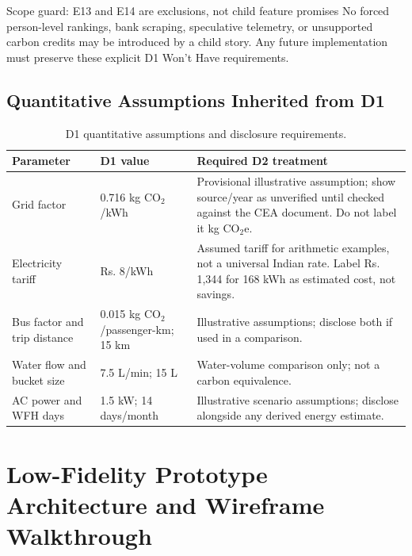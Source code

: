\documentclass[12pt,a4paper]{article}
\begin{document}
\begin{cautionbox}{Scope guard: E13 and E14 are exclusions, not child feature promises}
No forced person-level rankings, bank scraping, speculative telemetry, or unsupported carbon credits may be introduced by a child story. Any future implementation must preserve these explicit D1 Won't Have requirements.
\end{cautionbox}

\subsection{Quantitative Assumptions Inherited from D1}
\begin{table}[H]
\centering
\small
\caption{D1 quantitative assumptions and disclosure requirements.}
\begin{tabularx}{\textwidth}{|p{3.1cm}|p{3.2cm}|X|}
\toprule
\textbf{Parameter} & \textbf{D1 value} & \textbf{Required D2 treatment}\\
\midrule
Grid factor & 0.716 kg CO$_2$/kWh & Provisional illustrative assumption; show source/year as unverified until checked against the CEA document. Do not label it kg CO$_2$e.\\
Electricity tariff & Rs. 8/kWh & Assumed tariff for arithmetic examples, not a universal Indian rate. Label Rs. 1,344 for 168 kWh as estimated cost, not savings.\\
Bus factor and trip distance & 0.015 kg CO$_2$/passenger-km; 15 km & Illustrative assumptions; disclose both if used in a comparison.\\
Water flow and bucket size & 7.5 L/min; 15 L & Water-volume comparison only; not a carbon equivalence.\\
AC power and WFH days & 1.5 kW; 14 days/month & Illustrative scenario assumptions; disclose alongside any derived energy estimate.\\
\bottomrule
\end{tabularx}
\end{table}


\clearpage
\section{Low-Fidelity Prototype Architecture and Wireframe Walkthrough}
\end{document}
